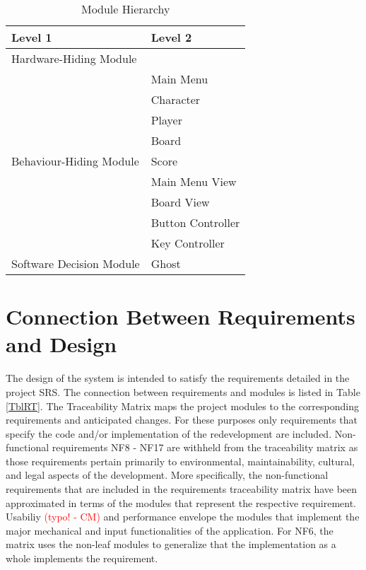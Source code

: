 \documentclass[12pt, titlepage]{article}
\begin{document}
\begin{table}[h!]
\centering
\begin{tabular}{p{} p{}}
\toprule
\textbf{Level 1} & \textbf{Level 2}\\
\midrule

{Hardware-Hiding Module} & ~ \\
\midrule

\multirow{9}{0.3\textwidth}{Behaviour-Hiding Module}
& Main Menu\\
& Character\\
& Player\\
& Board\\
& Score\\
& Main Menu View\\ 
& Board View\\
& Button Controller\\
& Key Controller\\
\midrule

{Software Decision Module} & Ghost\\
\bottomrule

\end{tabular}
\caption{Module Hierarchy}
\label{TblMH}
\end{table}

\section{Connection Between Requirements and Design} \label{SecConnection}

The design of the system is intended to satisfy the requirements detailed in the project SRS. The connection
between requirements and modules is listed in Table \ref{TblRT}. The Traceability Matrix maps the project modules to the corresponding requirements and anticipated changes. For these purposes only requirements that specify the code and/or implementation of the redevelopment are included. Non-functional requirements NF8 - NF17 are withheld from the traceability matrix as those requirements pertain primarily to environmental, maintainability, cultural, and legal aspects of the development. More specifically, the non-functional requirements that are included in the requirements traceability matrix have been approximated in terms of the modules that represent the respective requirement. Usabiliy \textcolor{red}{(typo! - CM)} and performance envelope the modules that implement the major mechanical and input functionalities of the application. For NF6, the matrix uses the non-leaf modules to generalize that the implementation as a whole implements the requirement.
\end{document}
